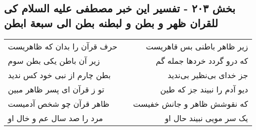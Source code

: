 \begin{center}
\section*{بخش ۲۰۳ - تفسیر این خبر مصطفی علیه السلام کی للقران ظهر و بطن و لبطنه بطن الی سبعة ابطن}
\label{sec:sh203}
\begin{longtable}{l p{0.5cm} r}
حرف قرآن را بدان که ظاهریست
&&
زیر ظاهر باطنی بس قاهریست
\\
زیر آن باطن یکی بطن سوم
&&
که درو گردد خردها جمله گم
\\
بطن چارم از نبی خود کس ندید
&&
جز خدای بی‌نظیر بی‌ندید
\\
تو ز قرآن ای پسر ظاهر مبین
&&
دیو آدم را نبیند جز که طین
\\
ظاهر قرآن چو شخص آدمیست
&&
که نقوشش ظاهر و جانش خفیست
\\
مرد را صد سال عم و خال او
&&
یک سر مویی نبیند حال او
\\
\end{longtable}
\end{center}
